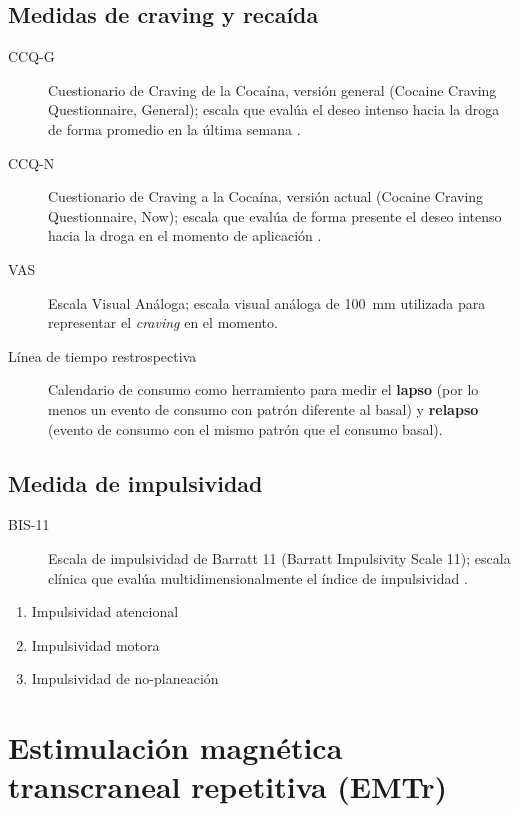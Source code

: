 \subsection{Medidas de craving y recaída}
\begin{description}
    \item[CCQ-G] Cuestionario de Craving de la Cocaína, versión general (Cocaine Craving Questionnaire, General); escala que evalúa el deseo intenso hacia la droga de forma promedio en la última semana \parencite{Tiffany1993}.
    \item[CCQ-N] Cuestionario de Craving a la Cocaína, versión actual (Cocaine Craving Questionnaire, Now); escala que evalúa de forma presente el deseo intenso hacia la droga en el momento de aplicación \parencite{Tiffany1993}.
    \item[VAS] Escala Visual Análoga; escala visual análoga de \SI{100}{\milli\meter} utilizada para representar el \textit{craving} en el momento.
    \item[Línea de tiempo restrospectiva] Calendario de consumo como herramiento para medir el \textbf{lapso} (por lo menos un evento de consumo con patrón diferente al basal) y \textbf{relapso} (evento de consumo con el mismo patrón que el consumo basal).
\end{description}
\subsection{Medida de impulsividad}
\begin{description}
    \item[BIS-11] Escala de impulsividad de Barratt 11 (Barratt Impulsivity Scale 11); escala clínica que evalúa multidimensionalmente el índice de impulsividad \parencite{H.Patton1995,SALVO2013}.
\end{description}
\begin{enumerate}[label=Subescala \arabic*., left= \parindent]
    \item Impulsividad atencional
    \item Impulsividad motora
    \item Impulsividad de no-planeación
\end{enumerate}

\section{Estimulación magnética transcraneal repetitiva (EMTr)}








